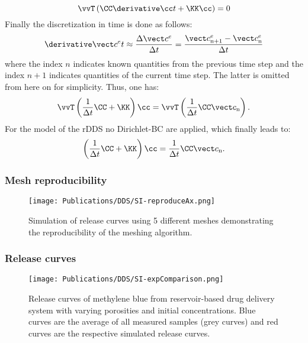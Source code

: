   \begin{equation}
    \vvT \left(\CC \dccDt + \KK \cc \right) = 0 \label{eq:FEM}
  \end{equation}
  Finally the discretization in time is done as follows:
  \begin{equation}
    \dcceDt \approx \frac{\Delta \cce}{\Dt}  = \frac{\ccenI-\ccen}{\Delta t}
  \end{equation}
  where the index $n$ indicates known quantities from the previous time step and the index $n+1$ indicates quantities of the current time step. The latter is omitted from here on for simplicity.
  Thus, one has: 
  \begin{equation}
    \vvT \left( \frac{1}{\Dt}\CC+ \KK \right) \cc = \vvT \left(\frac{1}{\Dt} \CC \ccn\right).
  \end{equation}
  For the model of the rDDS no Dirichlet-BC are applied, which finally leads to: 
  \begin{equation}
    \left( \frac{1}{\Dt}\CC+ \KK \right) \cc = \frac{1}{\Dt}\CC \ccn.
  \end{equation} 

  \newpage
  \subsubsection*{Mesh reproducibility}
  \begin{figure}[h!]
    \texttt{[image: Publications/DDS/SI-reproduceAx.png]}
    \caption{Simulation of release curves using 5 different meshes demonstrating the reproducibility of the meshing algorithm.}
    \label{fig:MeshReproducibility}
  \end{figure}

  \newpage
  \subsubsection*{Release curves}
  \begin{figure}[h!]
    \texttt{[image: Publications/DDS/SI-expComparison.png]}
    \caption{Release curves of methylene blue from reservoir-based drug delivery system with varying porosities and initial concentrations. Blue curves are the average of all measured samples (grey curves) and red curves are the respective simulated release curves. }
    \label{fig:expComparison}
  \end{figure}
